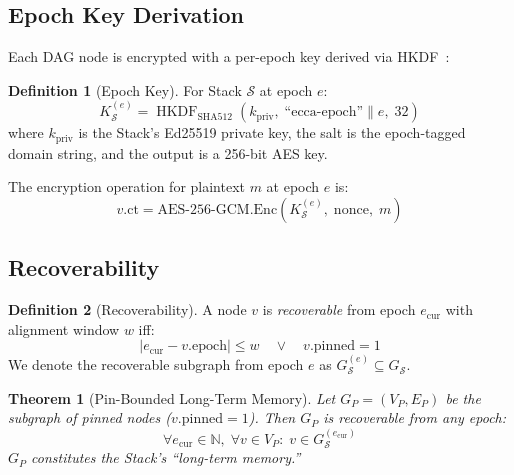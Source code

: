 \documentclass[11pt,twocolumn]{article}
\theoremstyle{definition}
\newtheorem{definition}{Definition}[section]
\theoremstyle{plain}
\newtheorem{theorem}{Theorem}[section]
\theoremstyle{remark}
\newcommand{\N}{\mathbb{N}}
\DeclareMathOperator{\hkdf}{HKDF}
\begin{document}
\subsection{Epoch Key Derivation}

Each DAG node is encrypted with a per-epoch key derived via HKDF~\cite{krawczyk2010hkdf}:

\begin{definition}[Epoch Key]\label{def:epoch-key}
For Stack $\mathcal{S}$ at epoch $e$:
\begin{equation}\label{eq:epoch-key}
  K^{(e)}_\mathcal{S} = \hkdf_{\mathrm{SHA512}}\!\left(k_{\mathrm{priv}},\; \text{``ecca-epoch''} \| e,\; 32\right)
\end{equation}
where $k_{\mathrm{priv}}$ is the Stack's Ed25519 private key, the salt is the epoch-tagged domain string, and the output is a 256-bit AES key.
\end{definition}

The encryption operation for plaintext $m$ at epoch $e$ is:
\begin{equation}
  v.\mathrm{ct} = \mathrm{AES\text{-}256\text{-}GCM}.\mathrm{Enc}(K^{(e)}_\mathcal{S},\; \mathrm{nonce},\; m)
\end{equation}

\subsection{Recoverability}

\begin{definition}[Recoverability]\label{def:recoverable}
A node $v$ is \emph{recoverable} from epoch $e_{\mathrm{cur}}$ with alignment window $w$ iff:
\begin{equation}\label{eq:recoverable}
  |e_{\mathrm{cur}} - v.\mathrm{epoch}| \leq w \quad \lor \quad v.\mathrm{pinned} = 1
\end{equation}
We denote the recoverable subgraph from epoch $e$ as $G^{(e)}_\mathcal{S} \subseteq G_\mathcal{S}$.
\end{definition}

\begin{theorem}[Pin-Bounded Long-Term Memory]\label{thm:pin-recovery}
Let $G_P = (V_P, E_P)$ be the subgraph of pinned nodes ($v.\mathrm{pinned} = 1$). Then $G_P$ is recoverable from any epoch:
\begin{equation}
  \forall e_{\mathrm{cur}} \in \N,\; \forall v \in V_P: \; v \in G^{(e_{\mathrm{cur}})}_\mathcal{S}
\end{equation}
$G_P$ constitutes the Stack's ``long-term memory.''
\end{theorem}
\end{document}
